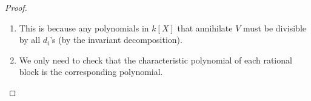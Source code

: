 \documentclass{note-eng}
\begin{document}
\begin{proof}
    \begin{enumerate}
        \item This is because any polynomials in $k[X]$ that annihilate $V$ must be divisible by all $d_i$'s (by the invariant decomposition).
        \item We only need to check that the characteristic polynomial of each rational block is the corresponding polynomial.
    \end{enumerate}
\end{proof}
\end{document}
